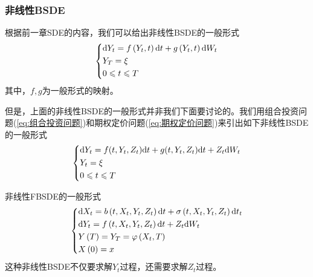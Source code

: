 		\subsubsection{非线性BSDE}
			根据前一章SDE的内容，我们可以给出非线性BSDE的一般形式
			\begin{equation*}
				\centering
				\left\{\begin{lgathered}
				{\mathrm{d}{Y_t} = f\left( {{Y_t},t} \right)\mathrm{d}t + g\left( {{Y_t},t} \right)\mathrm{d}{W_t}}\\
				{Y_T} = \xi \\
				0 \leqslant t \leqslant T
				\end{lgathered} \right.
			\end{equation*}
			其中，$f,g$为一般形式的映射。
			\par
			但是，上面的非线性BSDE的一般形式并非我们下面要讨论的。我们用组合投资问题(\ref{eq:组合投资问题})和期权定价问题(\ref{eq:期权定价问题})来引出如下非线性BSDE的一般形式
			\begin{equation*}
				\centering
				\left\{\begin{lgathered}
				{\mathrm{d}{Y_t} = f( {t,{Y_t},{Z_t}} )\mathrm{d}t + g( {t,{Y_t},{Z_t}} )\mathrm{d}t + {Z_t}\mathrm{d}{W_t}}\\
				{{Y_t} = \xi }\\
				{0 \leqslant t \leqslant T}
				\end{lgathered} \right.
			\end{equation*}
			\par
			非线性FBSDE的一般形式
				\begin{equation*}
				\centering
				\left\{\begin{lgathered}
				\mathrm{d}{X_t} = b\left( {t,{X_t},{Y_t},{Z_t}} \right)\mathrm{d}t + \sigma \left( {t,{X_t},{Y_t},{Z_t}} \right)\mathrm{d}{t_t}\\
				\mathrm{d}{Y_t} = f\left( {t,{X_t},{Y_t},{Z_t}} \right)\mathrm{d}t + {Z_t}\mathrm{d}{W_t}\\
				Y\left( T \right) = {Y_T} = \varphi \left( {{X_t},T} \right)\\
				X\left( 0 \right) = x
				\end{lgathered} \right.
				\end{equation*}
			这种非线性BSDE不仅要求解$Y_t$过程，还需要求解$Z_t$过程。

